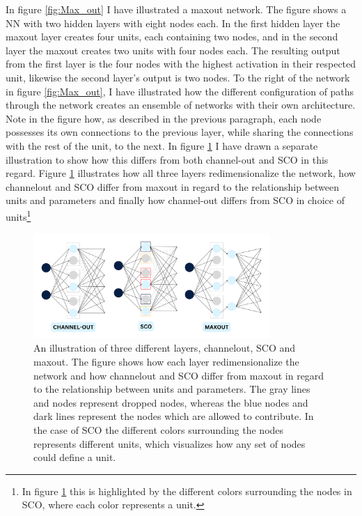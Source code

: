 In figure \ref{fig:Max_out} I have illustrated a maxout network. The figure shows a \ac{NN} with two hidden layers
with eight nodes each. In the first hidden layer the maxout layer creates four units, each containing two nodes, and in the 
second layer the maxout creates two units with four nodes each. The resulting output from the first layer is the 
four nodes with the highest activation in their respected unit, likewise the second layer's output is two nodes.
To the right of the network in figure \ref{fig:Max_out}, I have illustrated how the different configuration of 
paths through the network creates an ensemble of networks with their own architecture. Note in the figure how, as described in the 
previous paragraph, each node possesses its own connections to the previous layer, while sharing the connections with the 
rest of the unit, to the next. In figure \ref{fig:NetEnsembleComp} I have drawn a separate illustration to show how 
this differs from both channel-out and \ac{SCO} in this regard. Figure \ref{fig:NetEnsembleComp} illustrates how 
all three layers redimensionalize the network, how channelout and \ac{SCO} differ from maxout in regard to the relationship 
between units and parameters and finally how channel-out differs from \ac{SCO} in choice of units\footnote{In figure 
\ref{fig:NetEnsembleComp} this is highlighted by the different colors surrounding the nodes in \ac{SCO}, where each color 
represents a unit.}
\begin{figure}
    \centering
    \includegraphics[width=0.8\textwidth]{Figures/Illustrations/EnsembleComp.png}
    \caption[An illustration of three different layers, channelout, \acs{SCO} and maxout.]{An illustration of three different layers, channelout, 
    \ac{SCO} and maxout. The figure shows how each layer redimensionalize the network and how channelout and \ac{SCO} differ from maxout in regard 
    to the relationship between units and parameters. The gray lines and nodes represent dropped nodes, whereas the blue nodes and dark lines represent
    the nodes which are allowed to contribute. In the case of \ac{SCO} the different colors surrounding the nodes represents different units, which 
    visualizes how any set of nodes could define a unit.}
    \label{fig:NetEnsembleComp}
\end{figure}
